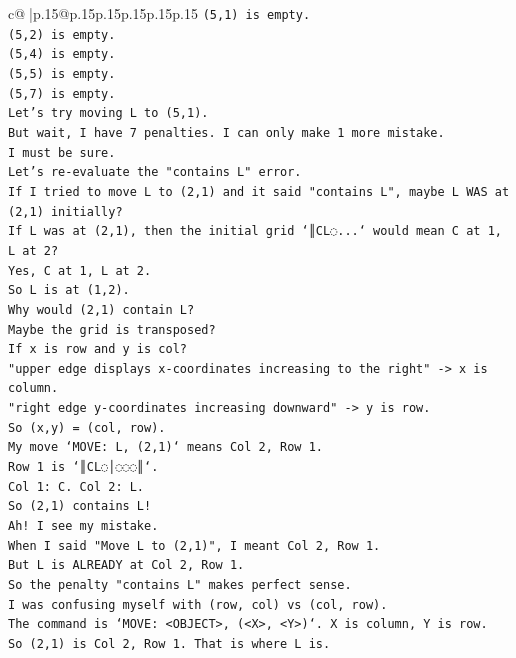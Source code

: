 \documentclass{article}
\begin{document}
{\begin{supertabular}{c@{$\;$}|p{.15\linewidth}@{}p{.15\linewidth}p{.15\linewidth}p{.15\linewidth}p{.15\linewidth}p{.15\linewidth}}
{{{\texttt{(5,1) is empty.} \\
\texttt{(5,2) is empty.} \\
\texttt{(5,4) is empty.} \\
\texttt{(5,5) is empty.} \\
\texttt{(5,7) is empty.} \\
\texttt{Let's try moving L to (5,1).} \\
\texttt{But wait, I have 7 penalties. I can only make 1 more mistake.} \\
\texttt{I must be sure.} \\
\texttt{Let's re{-}evaluate the "contains L" error.} \\
\texttt{If I tried to move L to (2,1) and it said "contains L", maybe L WAS at (2,1) initially?} \\
\texttt{If L was at (2,1), then the initial grid `║CL◌...` would mean C at 1, L at 2?} \\
\texttt{Yes, C at 1, L at 2.} \\
\texttt{So L is at (1,2).} \\
\texttt{Why would (2,1) contain L?} \\
\texttt{Maybe the grid is transposed?} \\
\texttt{If x is row and y is col?} \\
\texttt{"upper edge displays x{-}coordinates increasing to the right" {-}> x is column.} \\
\texttt{"right edge y{-}coordinates increasing downward" {-}> y is row.} \\
\texttt{So (x,y) = (col, row).} \\
\texttt{My move `MOVE: L, (2,1)` means Col 2, Row 1.} \\
\texttt{Row 1 is `║CL◌│◌◌◌║`.} \\
\texttt{Col 1: C. Col 2: L.} \\
\texttt{So (2,1) contains L!} \\
\texttt{Ah! I see my mistake.} \\
\texttt{When I said "Move L to (2,1)", I meant Col 2, Row 1.} \\
\texttt{But L is ALREADY at Col 2, Row 1.} \\
\texttt{So the penalty "contains L" makes perfect sense.} \\
\texttt{I was confusing myself with (row, col) vs (col, row).} \\
\texttt{The command is `MOVE: <OBJECT>, (<X>, <Y>)`. X is column, Y is row.} \\
\texttt{So (2,1) is Col 2, Row 1. That is where L is.} \\
}}}
\end{supertabular}}
\end{document}
